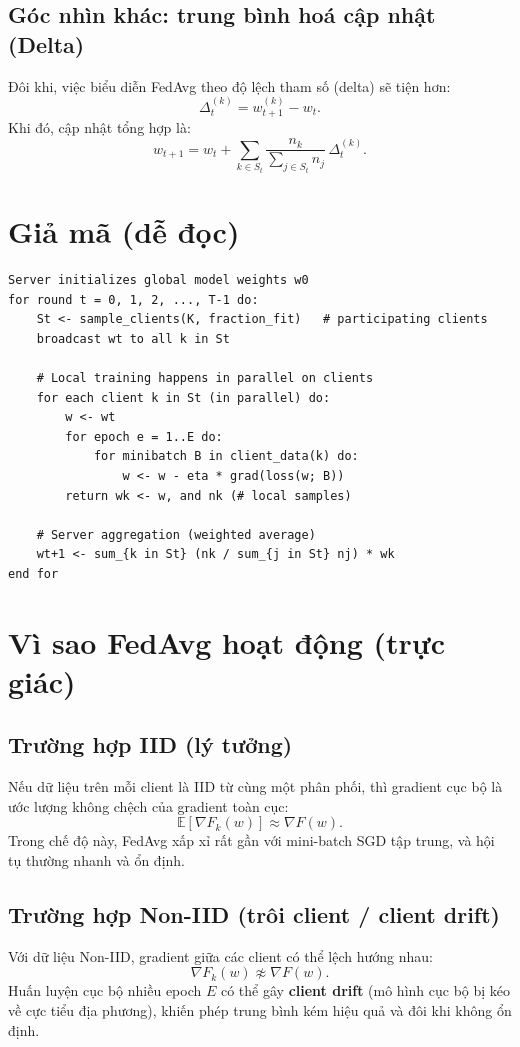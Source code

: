 \documentclass[12pt,a4paper]{article}
\begin{document}
\subsection{Góc nhìn khác: trung bình hoá cập nhật (Delta)}

Đôi khi, việc biểu diễn FedAvg theo độ lệch tham số (delta) sẽ tiện hơn:
\[
\Delta_t^{(k)} = w_{t+1}^{(k)} - w_t.
\]
Khi đó, cập nhật tổng hợp là:
\[
w_{t+1} = w_t + \sum_{k \in S_t} \frac{n_k}{\sum_{j \in S_t} n_j}\,\Delta_t^{(k)}.
\]

\section{Giả mã (dễ đọc)}

\begin{lstlisting}[language={},caption={Giả mã FedAvg (server + clients)}]
Server initializes global model weights w0
for round t = 0, 1, 2, ..., T-1 do:
    St <- sample_clients(K, fraction_fit)   # participating clients
    broadcast wt to all k in St

    # Local training happens in parallel on clients
    for each client k in St (in parallel) do:
        w <- wt
        for epoch e = 1..E do:
            for minibatch B in client_data(k) do:
                w <- w - eta * grad(loss(w; B))
        return wk <- w, and nk (# local samples)

    # Server aggregation (weighted average)
    wt+1 <- sum_{k in St} (nk / sum_{j in St} nj) * wk
end for
\end{lstlisting}

\section{Vì sao FedAvg hoạt động (trực giác)}

\subsection{Trường hợp IID (lý tưởng)}
Nếu dữ liệu trên mỗi client là IID từ cùng một phân phối, thì gradient cục bộ là ước lượng không chệch của gradient toàn cục:
\[
\mathbb{E}[\nabla F_k(w)] \approx \nabla F(w).
\]
Trong chế độ này, FedAvg xấp xỉ rất gần với mini-batch SGD tập trung, và hội tụ thường nhanh và ổn định.

\subsection{Trường hợp Non-IID (trôi client / client drift)}
Với dữ liệu Non-IID, gradient giữa các client có thể lệch hướng nhau:
\[
\nabla F_k(w) \not\approx \nabla F(w).
\]
Huấn luyện cục bộ nhiều epoch $E$ có thể gây \textbf{client drift} (mô hình cục bộ bị kéo về cực tiểu địa phương), khiến phép trung bình kém hiệu quả và đôi khi không ổn định.
\end{document}
